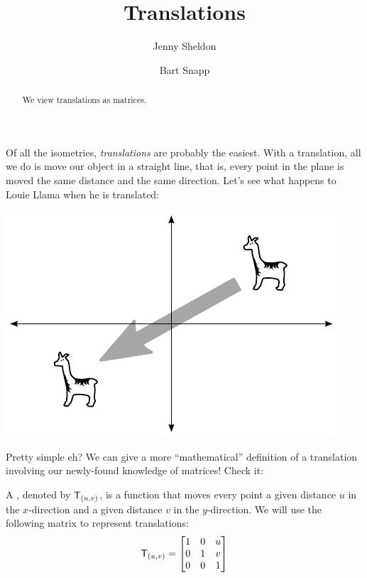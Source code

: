 \documentclass{ximera}
\author{Jenny Sheldon \and Bart Snapp}
\title{Translations}
\begin{document}
\begin{abstract}
  We view translations as matrices.
\end{abstract}
\maketitle

Of all the isometries, \textit{translations} are probably the
easiest. With a translation, all we do is move our object in a
straight line, that is, every point in the plane is moved the same
distance and the same direction. Let's see what happens to Louie
Llama when he is translated:
\begin{image}
\includegraphics{transIdeaEg.pdf}
\end{image}

Pretty simple eh? We can give a more ``mathematical'' definition of a
translation involving our newly-found knowledge of matrices! Check it:

\begin{definition}
A , denoted by $\mathsf{T}_{(u,v)}$, is a function
that moves every point a given distance $u$ in the $x$-direction and a
given distance $v$ in the $y$-direction. We will use the following
matrix to represent translations:
\[
\mathsf{T}_{(u,v)} = 
\begin{bmatrix}
1 & 0 & u \\ 
0 & 1 & v \\
0 & 0 & 1
\end{bmatrix}
\]
\end{definition}
\end{document}
